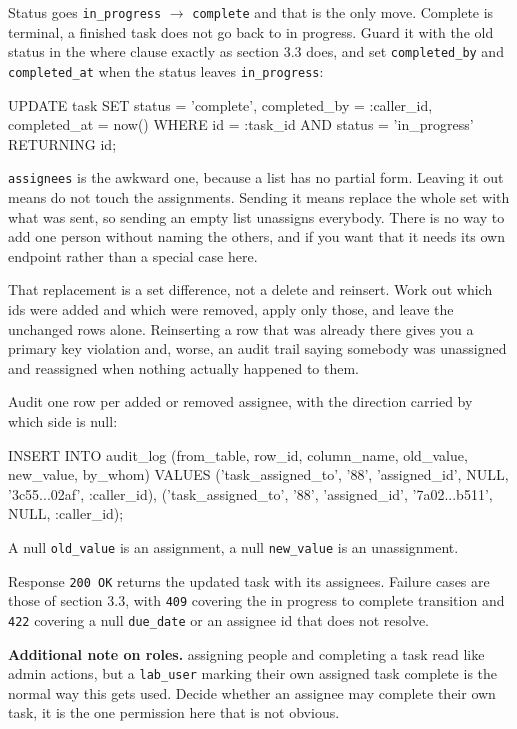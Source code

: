 \documentclass[12pt,letterpaper]{article}
\newenvironment{note}[1][Additional note]
  {\begin{notebox}\noindent\textbf{#1.}\space\ignorespaces}
  {\end{notebox}}
\begin{document}
Status goes \texttt{in\_progress} $\to$ \texttt{complete} and that is the only
move. Complete is terminal, a finished task does not go back to in progress.
Guard it with the old status in the where clause exactly as section 3.3 does,
and set \texttt{completed\_by} and \texttt{completed\_at} when the status leaves
\texttt{in\_progress}:

\begin{code}
UPDATE task
   SET status = 'complete',
       completed_by = :caller_id,
       completed_at = now()
 WHERE id = :task_id
   AND status = 'in_progress'
RETURNING id;
\end{code}

\texttt{assignees} is the awkward one, because a list has no partial form.
Leaving it out means do not touch the assignments. Sending it means replace the
whole set with what was sent, so sending an empty list unassigns everybody.
There is no way to add one person without naming the others, and if you want
that it needs its own endpoint rather than a special case here.

That replacement is a set difference, not a delete and reinsert. Work out which
ids were added and which were removed, apply only those, and leave the unchanged
rows alone. Reinserting a row that was already there gives you a primary key
violation and, worse, an audit trail saying somebody was unassigned and
reassigned when nothing actually happened to them.

Audit one row per added or removed assignee, with the direction carried by which
side is null:

\begin{code}
INSERT INTO audit_log
  (from_table, row_id, column_name,
   old_value, new_value, by_whom)
VALUES
  ('task_assigned_to', '88', 'assigned_id',
   NULL, '3c55...02af', :caller_id),
  ('task_assigned_to', '88', 'assigned_id',
   '7a02...b511', NULL, :caller_id);
\end{code}

A null \texttt{old\_value} is an assignment, a null \texttt{new\_value} is an
unassignment.

Response \texttt{200 OK} returns the updated task with its assignees. Failure
cases are those of section 3.3, with \texttt{409} covering the in progress to
complete transition and \texttt{422} covering a null \texttt{due\_date} or an
assignee id that does not resolve.

\begin{note}[Additional note on roles]
assigning people and completing a task read like admin actions, but a
\texttt{lab\_user} marking their own assigned task complete is the normal way
this gets used. Decide whether an assignee may complete their own task, it is
the one permission here that is not obvious.
\end{note}
\end{document}
